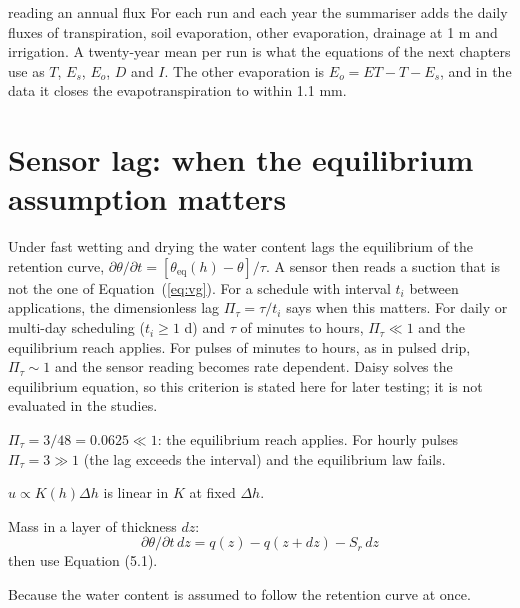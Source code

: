 \begin{daisybox}{reading an annual flux}
For each run and each year the summariser adds the daily fluxes of transpiration, soil evaporation, other evaporation, drainage at 1 m and irrigation. A twenty-year mean per run is what the equations of the next chapters use as $T$, $E_s$, $E_o$, $D$ and $I$. The other evaporation is $E_o=ET-T-E_s$, and in the data it closes the evapotranspiration to within 1.1 mm.
\end{daisybox}

\section{Sensor lag: when the equilibrium assumption matters}\label{sec:lag}
Under fast wetting and drying the water content lags the equilibrium of the retention curve, $\partial\theta/\partial t=[\theta_{\mathrm{eq}}(h)-\theta]/\tau$. A sensor then reads a suction that is not the one of Equation~(\ref{eq:vg}). For a schedule with interval $t_i$ between applications, the dimensionless lag $\Pi_\tau=\tau/t_i$ says when this matters. For daily or multi-day scheduling ($t_i\ge1$ d) and $\tau$ of minutes to hours, $\Pi_\tau\ll1$ and the equilibrium reach applies. For pulses of minutes to hours, as in pulsed drip, $\Pi_\tau\sim1$ and the sensor reading becomes rate dependent. Daisy solves the equilibrium equation, so this criterion is stated here for later testing; it is not evaluated in the studies.

\sol {}\ans $\Pi_\tau=3/48=0.0625\ll1$: the equilibrium reach applies. For hourly pulses $\Pi_\tau=3\gg1$ (the lag exceeds the interval) and the equilibrium law fails. \finans

\sol  $u\propto K(h)\Delta h$ is linear in $K$ at fixed $\Delta h$. \finans

\sol  Mass in a layer of thickness $dz$: \[\partial\theta/\partial t\,dz=q(z)-q(z+dz)-S_r\,dz\]
then use Equation (5.1). \finans

\sol  Because the water content is assumed to follow the retention curve at once.
